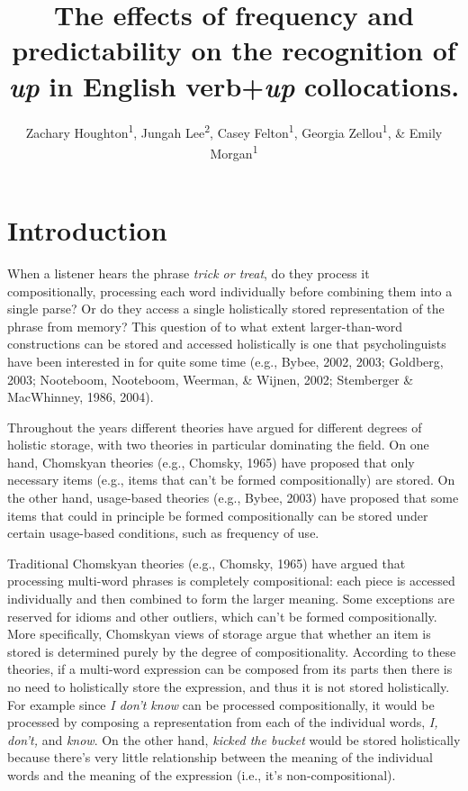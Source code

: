 \documentclass[
  man,floatsintext]{apa6}
\title{The effects of frequency and predictability on the recognition of \emph{up} in English verb+\emph{up} collocations.}
\author{Zachary Houghton\textsuperscript{1}, Jungah Lee\textsuperscript{2}, Casey Felton\textsuperscript{1}, Georgia Zellou\textsuperscript{1}, \& Emily Morgan\textsuperscript{1}}
\date{}
\affiliation{\vspace{0.5cm}\textsuperscript{1} University of California, Davis\\\textsuperscript{2} Chosun University}
\begin{document}
\maketitle

\hypertarget{introduction}{%
\section{Introduction}\label{introduction}}

When a listener hears the phrase \emph{trick or treat}, do they process it compositionally, processing each word individually before combining them into a single parse? Or do they access a single holistically stored representation of the phrase from memory? This question of to what extent larger-than-word constructions can be stored and accessed holistically is one that psycholinguists have been interested in for quite some time (e.g., Bybee, 2002, 2003; Goldberg, 2003; Nooteboom, Nooteboom, Weerman, \& Wijnen, 2002; Stemberger \& MacWhinney, 1986, 2004).

Throughout the years different theories have argued for different degrees of holistic storage, with two theories in particular dominating the field. On one hand, Chomskyan theories (e.g., Chomsky, 1965) have proposed that only necessary items (e.g., items that can't be formed compositionally) are stored. On the other hand, usage-based theories (e.g., Bybee, 2003) have proposed that some items that could in principle be formed compositionally can be stored under certain usage-based conditions, such as frequency of use.

Traditional Chomskyan theories (e.g., Chomsky, 1965) have argued that processing multi-word phrases is completely compositional: each piece is accessed individually and then combined to form the larger meaning. Some exceptions are reserved for idioms and other outliers, which can't be formed compositionally. More specifically, Chomskyan views of storage argue that whether an item is stored is determined purely by the degree of compositionality. According to these theories, if a multi-word expression can be composed from its parts then there is no need to holistically store the expression, and thus it is not stored holistically. For example since \emph{I don't know} can be processed compositionally, it would be processed by composing a representation from each of the individual words, \emph{I, don't,} and \emph{know}. On the other hand, \emph{kicked the bucket} would be stored holistically because there's very little relationship between the meaning of the individual words and the meaning of the expression (i.e., it's non-compositional).
\end{document}

